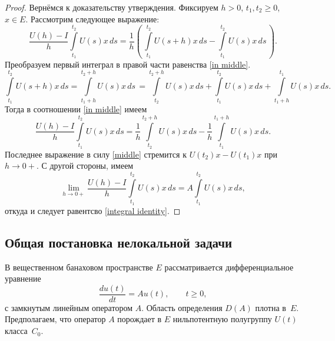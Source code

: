 \documentclass{article}
\renewcommand{\ge}{\geqslant}
\theoremstyle{definition}
\begin{document}
\begin{proof}
	Вернёмся к доказательству утверждения. Фиксируем $h > 0$, $t_1, t_2 \ge 0$, $x \in E$. 
	Рассмотрим следующее выражение:
	\begin{equation} \label{in middle}
		\frac{U(h) - I}{h} \int\limits_{t_1}^{t_2} U(s)x \,ds = \frac{1}{h} 
		\left(\, \int\limits_{t_1}^{t_2} U(s + h)x \,ds - \int\limits_{t_1}^{t_2} U(s)x \,ds \,\right).
	\end{equation}
	Преобразуем первый интеграл в правой части равенства \eqref{in middle}.
	\begin{equation*}
		\int\limits_{t_1}^{t_2} U(s + h)x \,ds = \int\limits_{t_1 + h}^{t_2 + h} U(s)x \,ds\, = 
		\int\limits_{t_2}^{t_2 + h} U(s)x \,ds + \int\limits_{t_1}^{t_2} U(s)x \,ds + \int\limits_{t_1 + h}^{t_1} U(s)x \,ds.
	\end{equation*}
	Тогда в соотношении \eqref{in middle} имеем
	\begin{equation*}
		\frac{U(h) - I}{h} \int\limits_{t_1}^{t_2} U(s)x \,ds =  
		\frac{1}{h} \int\limits_{t_2}^{t_2 + h} U(s)x \,ds - \frac{1}{h} \int\limits_{t_1}^{t_1 + h} U(s)x \,ds.
	\end{equation*}
	Последнее выражение в силу \eqref{middle} стремится к $ U(t_2)x - U(t_1)x $ при $ h \rightarrow 0+ $. С другой стороны,
	имеем
	\begin{equation*}
		\lim\limits_{h \rightarrow 0+} \frac{U(h) - I}{h} \int\limits_{t_1}^{t_2} U(s)x \,ds = A\int\limits_{t_1}^{t_2} U(s)x \,ds,
	\end{equation*}
	откуда и следует равентсво \eqref{integral identity}.
\end{proof}

\subsection{Общая постановка нелокальной задачи}
В вещественном банаховом пространстве $E$ рассматривается дифференциальное уравнение
\begin{equation} \label{abstract equation}
	\frac{du(t)}{dt} = Au(t), \qquad t \ge 0,
\end{equation}
с замкнутым линейным оператором $A$. Область определения $D(A)$ плотна в~$E$. Предполагаем, что оператор $A$ порождает в $E$ нильпотентную полугруппу $U(t)$ класса~$C_0$.
\end{document}
